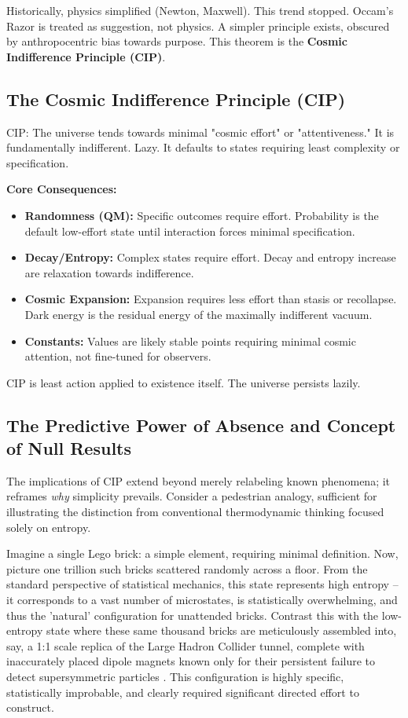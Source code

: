 \documentclass[11pt, a4paper]{article}
\begin{document}
Historically, physics simplified (Newton, Maxwell). This trend stopped. Occam's Razor \cite{Occam1347} is treated as suggestion, not physics. A simpler principle exists, obscured by anthropocentric bias towards purpose. This theorem is the \textbf{Cosmic Indifference Principle (CIP)}.

\subsection{The Cosmic Indifference Principle (CIP)}

CIP: The universe tends towards minimal "cosmic effort" or "attentiveness." It is fundamentally indifferent. Lazy. It defaults to states requiring least complexity or specification.

\textbf{Core Consequences:}
\begin{itemize}
    \item \textbf{Randomness (QM):} Specific outcomes require effort. Probability is the default low-effort state until interaction forces minimal specification.
    \item \textbf{Decay/Entropy:} Complex states require effort. Decay and entropy increase are relaxation towards indifference.
    \item \textbf{Cosmic Expansion:} Expansion requires less effort than stasis or recollapse. Dark energy is the residual energy of the maximally indifferent vacuum.
    \item \textbf{Constants:} Values are likely stable points requiring minimal cosmic attention, not fine-tuned for observers.
\end{itemize}

CIP is least action applied to existence itself. The universe persists lazily.

\subsection{The Predictive Power of Absence and Concept of Null Results}

The implications of CIP extend beyond merely relabeling known phenomena; it reframes \textit{why} simplicity prevails. Consider a pedestrian analogy, sufficient for illustrating the distinction from conventional thermodynamic thinking focused solely on entropy.

Imagine a single Lego brick: a simple element, requiring minimal definition. Now, picture one trillion such bricks scattered randomly across a floor. From the standard perspective of statistical mechanics, this state represents high entropy – it corresponds to a vast number of microstates, is statistically overwhelming, and thus the 'natural' configuration for unattended bricks. Contrast this with the low-entropy state where these same thousand bricks are meticulously assembled into, say, a 1:1 scale replica of the Large Hadron Collider tunnel, complete with inaccurately placed dipole magnets known only for their persistent failure to detect supersymmetric particles \cite{SupersymmetrySearches}. This configuration is highly specific, statistically improbable, and clearly required significant directed effort to construct.
\end{document}
